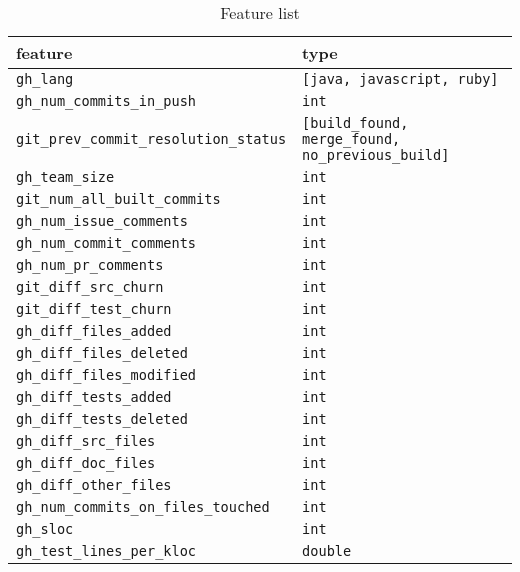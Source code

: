 \begin{table}[H]
	\caption{Feature list}
	\label{featureTable}
	\begin{tabularx}{\textwidth}{ l X }
		feature & type \\
		\hline
		\texttt{gh\_lang} &                             \texttt{[java, javascript, ruby]} \\ 
		\texttt{gh\_num\_commits\_in\_push} &              \texttt{int} \\ 
		\texttt{git\_prev\_commit\_resolution\_status} &   \texttt{[build\_found, merge\_found, no\_previous\_build]} \\ 
		\texttt{gh\_team\_size} &                        \texttt{int} \\ 
		\texttt{git\_num\_all\_built\_commits} &           \texttt{int} \\ 
		\texttt{gh\_num\_issue\_comments} &               \texttt{int} \\ 
		\texttt{gh\_num\_commit\_comments} &              \texttt{int} \\      
		\texttt{gh\_num\_pr\_comments} &                  \texttt{int} \\ 
		\texttt{git\_diff\_src\_churn} &                  \texttt{int} \\ 
		\texttt{git\_diff\_test\_churn} &                 \texttt{int} \\ 
		\texttt{gh\_diff\_files\_added} &                 \texttt{int} \\ 
		\texttt{gh\_diff\_files\_deleted} &               \texttt{int} \\ 
		\texttt{gh\_diff\_files\_modified} &              \texttt{int} \\ 
		\texttt{gh\_diff\_tests\_added} &                 \texttt{int} \\ 
		\texttt{gh\_diff\_tests\_deleted} &               \texttt{int} \\ 
		\texttt{gh\_diff\_src\_files} &                   \texttt{int} \\ 
		\texttt{gh\_diff\_doc\_files} &                   \texttt{int} \\ 
		\texttt{gh\_diff\_other\_files} &                 \texttt{int} \\ 
		\texttt{gh\_num\_commits\_on\_files\_touched} &     \texttt{int} \\ 
		\texttt{gh\_sloc} &                             \texttt{int} \\ 
		\texttt{gh\_test\_lines\_per\_kloc} &              \texttt{double} \\ 

\end{tabularx}
\end{table}
